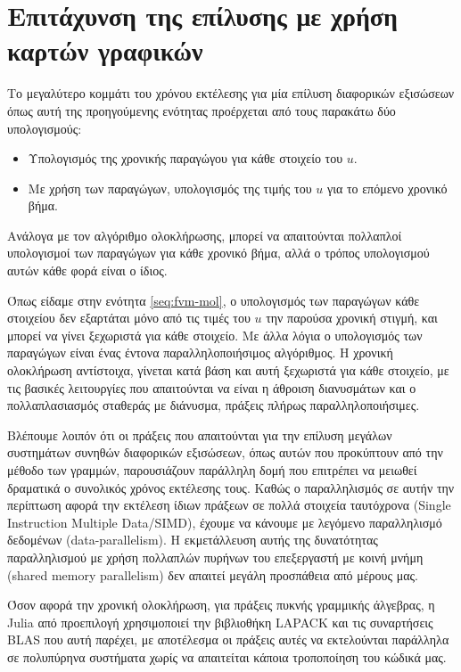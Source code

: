 \section{Επιτάχυνση της επίλυσης με χρήση καρτών γραφικών}

Το μεγαλύτερο κομμάτι του χρόνου εκτέλεσης για μία επίλυση διαφορικών εξισώσεων όπως αυτή της προηγούμενης ενότητας προέρχεται από τους παρακάτω δύο υπολογισμούς:

\begin{itemize}
    \item Υπολογισμός της χρονικής παραγώγου για κάθε στοιχείο του $u$.
    \item Με χρήση των παραγώγων, υπολογισμός της τιμής του $u$ για το επόμενο χρονικό βήμα.
\end{itemize}

Ανάλογα με τον αλγόριθμο ολοκλήρωσης, μπορεί να απαιτούνται πολλαπλοί υπολογισμοί των παραγώγων για κάθε χρονικό βήμα, αλλά ο τρόπος υπολογισμού αυτών κάθε φορά είναι ο ίδιος.

Όπως είδαμε στην ενότητα \ref{seq:fvm-mol}, ο υπολογισμός των παραγώγων κάθε στοιχείου δεν εξαρτάται μόνο από τις τιμές του $u$ την παρούσα χρονική στιγμή, και μπορεί να γίνει ξεχωριστά για κάθε στοιχείο.
Με άλλα λόγια ο υπολογισμός των παραγώγων είναι ένας έντονα παραλληλοποιήσιμος αλγόριθμος.
Η χρονική ολοκλήρωση αντίστοιχα, γίνεται κατά βάση και αυτή ξεχωριστά για κάθε στοιχείο, με τις βασικές λειτουργίες που απαιτούνται να είναι η άθροιση διανυσμάτων και ο πολλαπλασιασμός σταθεράς με διάνυσμα, πράξεις πλήρως παραλληλοποιήσιμες.

Βλέπουμε λοιπόν ότι οι πράξεις που απαιτούνται για την επίλυση μεγάλων συστημάτων συνηθών διαφορικών εξισώσεων, όπως αυτών που προκύπτουν από την μέθοδο των γραμμών, παρουσιάζουν παράλληλη δομή που επιτρέπει να μειωθεί δραματικά ο συνολικός χρόνος εκτέλεσης τους.
Καθώς ο παραλληλισμός σε αυτήν την περίπτωση αφορά την εκτέλεση ίδιων πράξεων σε πολλά στοιχεία ταυτόχρονα (Single Instruction Multiple Data/SIMD), έχουμε να κάνουμε με λεγόμενο παραλληλισμό δεδομένων (data-parallelism).
Η εκμετάλλευση αυτής της δυνατότητας παραλληλισμού με χρήση πολλαπλών πυρήνων του επεξεργαστή με κοινή μνήμη (shared memory parallelism) δεν απαιτεί μεγάλη προσπάθεια από μέρους μας.

Όσον αφορά την χρονική ολοκλήρωση, για πράξεις πυκνής γραμμικής άλγεβρας, η Julia από προεπιλογή χρησιμοποιεί την βιβλιοθήκη LAPACK και τις συναρτήσεις BLAS που αυτή παρέχει, με αποτέλεσμα οι πράξεις αυτές να εκτελούνται παράλληλα σε πολυπύρηνα συστήματα χωρίς να απαιτείται κάποια τροποποίηση του κώδικά μας.

